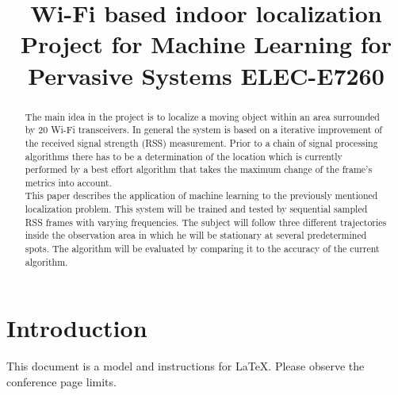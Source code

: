 \documentclass[conference]{IEEEtran}
\begin{document}
\title{Wi-Fi based indoor localization\\
{\footnotesize Project for Machine Learning for Pervasive Systems ELEC-E7260}
}

\author{
	\and
}

\maketitle

\begin{abstract}
The main idea in the project is to localize a moving object within an area surrounded by 20 Wi-Fi transceivers. In general the system is based on a iterative improvement of the received signal strength (RSS) measurement. Prior to a chain of signal processing algorithms there has to be a determination of the location which is currently performed by a best effort algorithm that takes the maximum change of the frame’s metrics into account.\\
This paper describes the application of machine learning to the previously mentioned localization problem. This system will be trained and tested by sequential sampled RSS frames with varying frequencies. The subject will follow three different trajectories inside the observation area in which he will be stationary at several predetermined spots. The algorithm will be evaluated by comparing it to the accuracy of the current algorithm.
\end{abstract}

\section{Introduction}
This document is a model and instructions for \LaTeX.
Please observe the conference page limits. 


\end{document}
